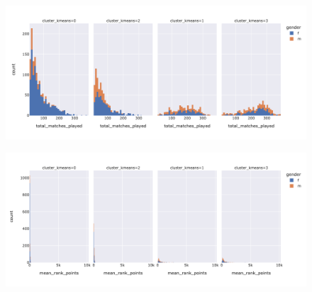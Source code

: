 \documentclass{article}
\begin{document}
\begin{figure}
\centering
\begin{minipage}{.5\textwidth}
\centering
\includegraphics[width=\textwidth]{plots/kmeans/hist_total_matches.png}
\label{fig:total_match_played_kmeans}
\end{minipage}%
\begin{minipage}{.5\textwidth}
\centering
\includegraphics[width=\textwidth]{plots/kmeans/hist_mean_rank_points.png}
\label{fig:mean_rank_points_kmeans}
\end{minipage}


\end{figure}
\end{document}
